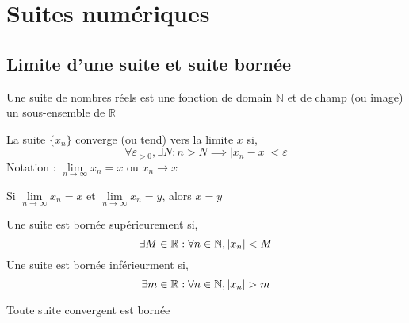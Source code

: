 \section{Suites numériques}
\subsection{Limite d'une suite et suite bornée}
	\begin{mydef}
		Une suite de nombres réels est une fonction de domain $\mathbb{N}$ et de champ (ou image) un sous-ensemble de $\mathbb{R}$
	\end{mydef}
	\begin{mydef}
		La suite $\{x_n\}$ converge (ou tend) vers la limite $x$ si, \[\forall\varepsilon_{>0},\exists N : n>N \implies |x_n-x|<\varepsilon\]
		Notation : $\lim\limits_{n\to\infty} x_n=x$ ou $x_n\longrightarrow x$
	\end{mydef}
	\begin{mythm}[Unicité]
		Si $\lim\limits_{n\to\infty}x_n =x$ et $\lim\limits_{n\to\infty}x_n=y$, alors $x=y$
	\end{mythm}
	\begin{mydef}
		Une suite est bornée supérieurement si,\[\exists M\in\mathbb{R} : \forall n\in\mathbb{N}, |x_n| < M\]Une suite est bornée inférieurment si,\[\exists m\inreal : \forall n\ininteger, |x_n|>m\]
	\end{mydef}
	\begin{mythm}
		Toute suite convergent est bornée
	\end{mythm}
